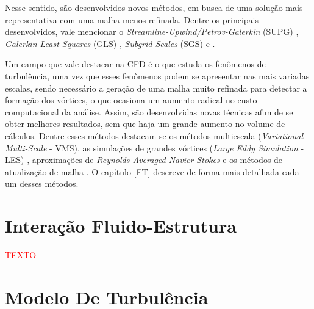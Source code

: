 \documentclass[_ArquivoPrincipal.tex]{subfiles}
\begin{document}
Nesse sentido, são desenvolvidos novos métodos, em busca de uma solução mais representativa com uma malha menos refinada. Dentre os principais desenvolvidos, vale mencionar o \textit{Streamline-Upwind/Petrov-Galerkin} (SUPG) \cite{brooks1982streamline}, \textit{Galerkin Least-Squares} (GLS) \cite{hughes1989new,tezduyar1991stabilized}, \textit{Subgrid Scales} (SGS) e \cite{hughes1995multiscale}.

Um campo que vale destacar na CFD é o que estuda os fenômenos de turbulência, uma vez que esses fenômenos podem se apresentar nas mais variadas escalas, sendo necessário a geração de uma malha muito refinada para detectar a formação dos vórtices, o que ocasiona um aumento radical no custo computacional da análise. Assim, são desenvolvidas novas técnicas afim de se obter melhores resultados, sem que haja um grande aumento no volume de cálculos. Dentre esses métodos destacam-se os métodos multiescala (\textit{Variational Multi-Scale} - VMS), as simulações de grandes vórtices (\textit{Large Eddy Simulation} - LES) \cite{hughes1995multiscale,hughes1998variational,hughes2002variational,bazilevs2010large,vsekutkovski2021partitioned}, aproximações de \textit{Reynolds-Averaged Navier-Stokes} \cite{alfonsi2009reynolds} e os métodos de atualização de malha \cite{de1993petrov}. O capítulo \ref{FT} descreve de forma mais detalhada cada um desses métodos.

\section{Interação Fluido-Estrutura} \label{IFE}

\textcolor{red}{TEXTO}

\section{Modelo De Turbulência} \label{MT}
\end{document}
